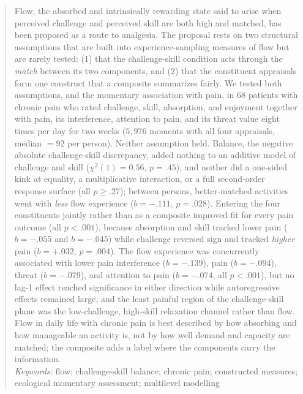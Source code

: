 \documentclass[11pt,a4paper]{article}
\begin{document}
\begin{titlepage}
\begin{abstract}
\noindent
Flow, the absorbed and intrinsically rewarding state said to arise when perceived challenge and
perceived skill are both high and matched, has been proposed as a route to analgesia. The
proposal rests on two structural assumptions that are built into experience-sampling measures of
flow but are rarely tested: (1) that the challenge-skill condition acts through the \emph{match}
between its two components, and (2) that the constituent appraisals form one construct that a
composite summarizes fairly. We tested both assumptions, and the momentary association with pain, in
$68$ patients with chronic pain who rated challenge, skill, absorption, and enjoyment together
with pain, its interference, attention to pain, and its threat value eight times per day for two
weeks ($5{,}976$ moments with all four appraisals, median $=92$ per person). Neither assumption
held. Balance, the negative absolute challenge-skill discrepancy, added nothing to an additive
model of challenge and skill ($\chi^2(1)=0.56$, $p=.45$), and neither did a one-sided kink at
equality, a multiplicative interaction, or a full second-order response surface (all $p \geq .27$);
between persons, better-matched activities went with \emph{less} flow experience ($b=-.111$,
$p=.028$). Entering the four constituents jointly rather than as a composite improved fit for
every pain outcome (all $p<.001$), because absorption and skill tracked lower pain
($b=-.055$ and $b=-.045$) while challenge reversed sign and tracked \emph{higher} pain
($b=+.032$, $p=.004$). The flow experience was concurrently associated with lower pain
interference ($b=-.139$), pain ($b=-.094$), threat ($b=-.079$), and attention to pain
($b=-.074$, all $p<.001$), but no lag-1 effect reached significance in either direction while
autoregressive effects remained large, and the least painful region of the challenge-skill plane
was the low-challenge, high-skill relaxation channel rather than flow. Flow in daily life with
chronic pain is best described by how absorbing and how manageable an activity is, not by how
well demand and capacity are matched; the composite adds a label where the components carry the
information.\\[0.5em]
\noindent\textit{Keywords:} flow; challenge-skill balance; chronic pain; constructed measures;
ecological momentary assessment; multilevel modelling
\end{abstract}

\vspace*{\fill}
\end{titlepage}
\setcounter{page}{2}
\end{document}
